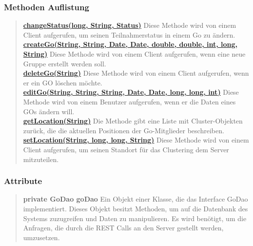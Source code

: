 \documentclass[11pt,a4paper]{article}
\begin{document}
{{{{{{{{{{{{{{{{{\subsubsection{Methoden Auflistung}{
\begin{verse}
\hyperlink{edu.kit.pse17.go_app.ClientCommunication.Upstream.GoRestController.changeStatus(long, java.lang.String, edu.kit.pse17.go_app.PersistenceLayer.Status)}{{\bf changeStatus(long, String, Status)}} Diese Methode wird von einem Client aufgerufen, um seinen Teilnahmerstatus in einem Go zu ändern.\\
\hyperlink{edu.kit.pse17.go_app.ClientCommunication.Upstream.GoRestController.createGo(java.lang.String, java.lang.String, java.util.Date, java.util.Date, double, double, int, long, java.lang.String)}{{\bf createGo(String, String, Date, Date, double, double, int, long, String)}} Diese Methode wird von einem Client aufgerufen, wenn eine neue Gruppe erstellt werden soll.\\
\hyperlink{edu.kit.pse17.go_app.ClientCommunication.Upstream.GoRestController.deleteGo(java.lang.String)}{{\bf deleteGo(String)}} Diese Methode wird von einem Client aufgerufen, wenn er ein GO löschen möchte.\\
\hyperlink{edu.kit.pse17.go_app.ClientCommunication.Upstream.GoRestController.editGo(java.lang.String, java.lang.String, java.lang.String, java.util.Date, java.util.Date, long, long, int)}{{\bf editGo(String, String, String, Date, Date, long, long, int)}} Diese Methode wird von einem Benutzer aufgerufen, wenn er die Daten eines GOs ändern will.\\
\hyperlink{edu.kit.pse17.go_app.ClientCommunication.Upstream.GoRestController.getLocation(java.lang.String)}{{\bf getLocation(String)}} Die Methode gibt eine Liste mit Cluster-Objekten zurück, die die aktuellen Positionen der Go-Mitglieder beschreiben.\\
\hyperlink{edu.kit.pse17.go_app.ClientCommunication.Upstream.GoRestController.setLocation(java.lang.String, long, long, java.lang.String)}{{\bf setLocation(String, long, long, String)}} Diese Methode wird von einem Client aufgerufen, um seinen Standort für das Clustering dem Server mitzuteilen.\\
\end{verse}
}
\subsubsection{Attribute}{
\begin{verse}
{{\bf private GoDao goDao}} Ein Objekt einer Klasse, die das Interface GoDao implementiert. Dieses Objekt besitzt Methoden, um auf die Datenbank des Systems zuzugreifen und Daten zu manipulieren. Es wird benötigt, um die Anfragen, die durch die REST Calls an den Server gestellt werden, umzusetzen.
\end{verse}
}
}}}}}}}}}}}}}}}}}
\end{document}
